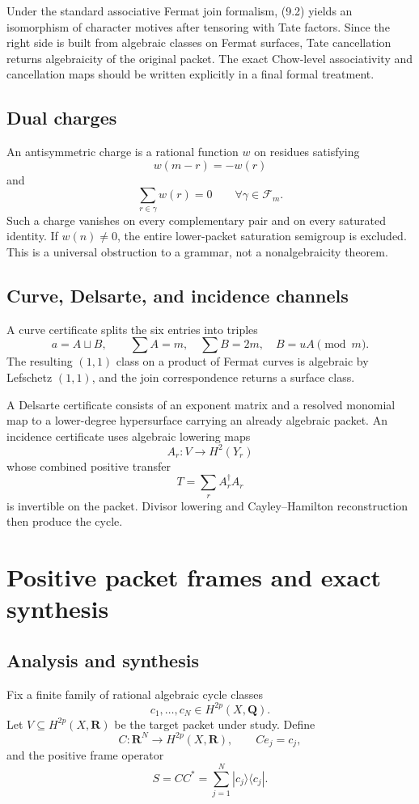 \documentclass[11pt,oneside]{book}
\theoremstyle{definition}
\theoremstyle{remark}
\newcommand{\Q}{\mathbf{Q}}
\newcommand{\R}{\mathbf{R}}
\begin{document}
Under the standard associative Fermat join formalism, (9.2) yields an isomorphism of character motives after tensoring with Tate factors. Since the right side is built from algebraic classes on Fermat surfaces, Tate cancellation returns algebraicity of the original packet. The exact Chow-level associativity and cancellation maps should be written explicitly in a final formal treatment.

\section{Dual charges}
An antisymmetric charge is a rational function \(w\) on residues satisfying
\[
w(m-r)=-w(r)
\]
and
\[
\sum_{r\in\gamma}w(r)=0
\qquad\forall \gamma\in\mathcal F_m.
\]
Such a charge vanishes on every complementary pair and on every saturated identity. If \(w(n)\ne0\), the entire lower-packet saturation semigroup is excluded. This is a universal obstruction to a grammar, not a nonalgebraicity theorem.

\section{Curve, Delsarte, and incidence channels}
A curve certificate splits the six entries into triples
\[
a=A\sqcup B,
\qquad \sum A=m,
\quad \sum B=2m,
\quad B=uA\pmod m.
\]
The resulting \((1,1)\) class on a product of Fermat curves is algebraic by Lefschetz \((1,1)\), and the join correspondence returns a surface class.

A Delsarte certificate consists of an exponent matrix and a resolved monomial map to a lower-degree hypersurface carrying an already algebraic packet. An incidence certificate uses algebraic lowering maps
\[
A_r:V\to H^2(Y_r)
\]
whose combined positive transfer
\[
T=\sum_rA_r^\dagger A_r
\]
is invertible on the packet. Divisor lowering and Cayley--Hamilton reconstruction then produce the cycle.


\chapter{Positive packet frames and exact synthesis}
\section{Analysis and synthesis}
Fix a finite family of rational algebraic cycle classes
\[
c_1,\ldots,c_N\in H^{2p}(X,\Q).
\]
Let $V\subseteq H^{2p}(X,\R)$ be the target packet under study. Define
\[
C:\R^N\to H^{2p}(X,\R),
\qquad Ce_j=c_j,
\]
and the positive frame operator
\[
S=CC^*=\sum_{j=1}^N|c_j\rangle\langle c_j|.
\]
\end{document}
